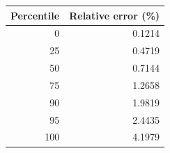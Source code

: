 \begin{tabular}{rr}
\toprule
Percentile & Relative error (\%) \\
\midrule
0 & 0.1214 \\
25 & 0.4719 \\
50 & 0.7144 \\
75 & 1.2658 \\
90 & 1.9819 \\
95 & 2.4435 \\
100 & 4.1979 \\
\bottomrule
\end{tabular}
